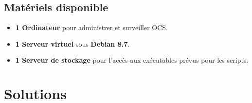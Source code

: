 \documentclass[11pt,a4paper,oneside]{article}
\begin{document}
\subsection{Matériels disponible}
\begin{itemize}
	\item \textbf{1 Ordinateur} pour administrer et surveiller OCS.
	\item \textbf{1 Serveur virtuel} sous \textbf{Debian 8.7}.
	\item \textbf{1 Serveur de stockage}  pour l'accès aux exécutables prévus pour les scripts. 
\end{itemize}
\newpage

\section{Solutions}
\end{document}
